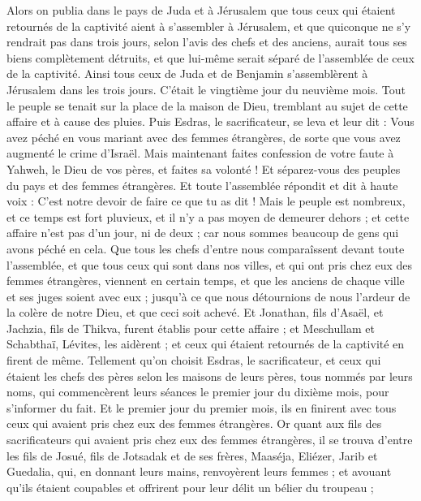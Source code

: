 \begin{multicols}{2}
Alors on publia dans le pays de Juda et à Jérusalem que tous ceux qui étaient retournés de la captivité aient à s'assembler à Jérusalem,
et que quiconque ne s'y rendrait pas dans trois jours, selon l'avis des chefs et des anciens, aurait tous ses biens complètement détruits, et que lui-même serait séparé de l'assemblée de ceux de la captivité.
Ainsi tous ceux de Juda et de Benjamin s'assemblèrent à Jérusalem dans les trois jours. C'était le vingtième jour du neuvième mois. Tout le peuple se tenait sur la place de la maison de Dieu, tremblant au sujet de cette affaire et à cause des pluies.
Puis Esdras, le sacrificateur, se leva et leur dit : Vous avez péché en vous mariant avec des femmes étrangères, de sorte que vous avez augmenté le crime d'Israël.
Mais maintenant faites confession de votre faute à Yahweh, le Dieu de vos pères, et faites sa volonté ! Et séparez-vous des peuples du pays et des femmes étrangères.
Et toute l'assemblée répondit et dit à haute voix : C'est notre devoir de faire ce que tu as dit !
Mais le peuple est nombreux, et ce temps est fort pluvieux, et il n'y a pas moyen de demeurer dehors ; et cette affaire n'est pas d'un jour, ni de deux ; car nous sommes beaucoup de gens qui avons péché en cela.
Que tous les chefs d'entre nous comparaîssent devant toute l'assemblée, et que tous ceux qui sont dans nos villes, et qui ont pris chez eux des femmes étrangères, viennent en certain temps, et que les anciens de chaque ville et ses juges soient avec eux ; jusqu'à ce que nous détournions de nous l'ardeur de la colère de notre Dieu, et que ceci soit achevé.
Et Jonathan, fils d'Asaël, et Jachzia, fils de Thikva, furent établis pour cette affaire ; et Meschullam et Schabthaï, Lévites, les aidèrent ;
et ceux qui étaient retournés de la captivité en firent de même. Tellement qu'on choisit Esdras, le sacrificateur, et ceux qui étaient les chefs des pères selon les maisons de leurs pères, tous nommés par leurs noms, qui commencèrent leurs séances le premier jour du dixième mois, pour s'informer du fait.
Et le premier jour du premier mois, ils en finirent avec tous ceux qui avaient pris chez eux des femmes étrangères.
Or quant aux fils des sacrificateurs qui avaient pris chez eux des femmes étrangères, il se trouva d'entre les fils de Josué, fils de Jotsadak et de ses frères, Maaséja, Eliézer, Jarib et Guedalia,
qui, en donnant leurs mains, renvoyèrent leurs femmes ; et avouant qu'ils étaient coupables et offrirent pour leur délit un bélier du troupeau ;

\end{multicols}
